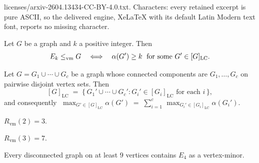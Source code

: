 \documentclass[10pt,a4paper]{amsart}
\newcommand{\LC}{\mathrm{LC}}
\newcommand{\Rvm}{R_{\mathrm{vm}}}
\newcommand{\vm}{\leq_{\mathrm{vm}}}
\begin{document}
licenses/arxiv-2604.13434-CC-BY-4.0.txt. Characters: every retained excerpt is pure ASCII, so the delivered engine, XeLaTeX with its default Latin Modern text font, reports no missing character.
\begin{proposition}\label{prop:alpha}
  Let $G$ be a graph and $k$ a positive integer.  Then
  \[
    E_k \vm G
    \quad\Longleftrightarrow\quad
    \alpha(G') \geq k
    \text{\; for some $G' \in [G]_{\LC}$.}
  \]
\end{proposition}

\begin{lemma}\label{lem:disconnected}
  Let $G=G_1\cup\cdots\cup G_c$ be a graph whose connected components
  are $G_1,\dots,G_c$ on pairwise disjoint vertex sets.  Then
  \[
    [G]_{\LC}
    \;=\;
    \bigl\{\,G_1'\cup\cdots\cup G_c' :
             G_i'\in[G_i]_{\LC}\text{ for each }i\,\bigr\},
  \]
  and consequently
  $\;\displaystyle
    \max_{G'\in[G]_{\LC}}\alpha(G')
    \;=\;
    \sum_{i=1}^{c}\,\max_{G_i'\in[G_i]_{\LC}}\alpha(G_i').
  $
\end{lemma}

\begin{proposition}\label{prop:Rvm2}
  $\Rvm(2) = 3$.
\end{proposition}

\begin{proposition}\label{prop:Rvm3}
  $\Rvm(3) = 7$.
\end{proposition}

\begin{proposition}\label{prop:disconnected-k4}
  Every disconnected graph on at least $9$ vertices contains $E_4$
  as a vertex-minor.
\end{proposition}
\end{document}

